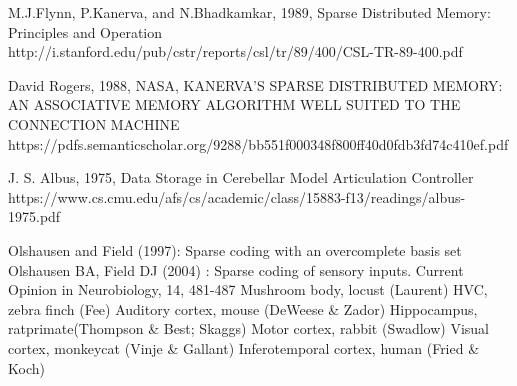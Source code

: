 \documentclass[10pt,a4paper]{article}
\begin{document}
\begin{thebibliography}{4}

 M.J.Flynn, P.Kanerva, and N.Bhadkamkar, 1989, Sparse Distributed Memory: Principles and Operation
http://i.stanford.edu/pub/cstr/reports/csl/tr/89/400/CSL-TR-89-400.pdf

 David Rogers, 1988, NASA, KANERVA’S SPARSE DISTRIBUTED MEMORY: AN ASSOCIATIVE MEMORY ALGORITHM WELL SUITED TO THE CONNECTION MACHINE
https://pdfs.semanticscholar.org/9288/bb551f000348f800ff40d0fdb3fd74c410ef.pdf

 J. S. Albus, 1975, Data Storage in Cerebellar Model Articulation Controller
https://www.cs.cmu.edu/afs/cs/academic/class/15883-f13/readings/albus-1975.pdf



 Olshausen and Field (1997): Sparse coding with an overcomplete basis set
 Olshausen BA, Field DJ (2004) : Sparse coding of sensory inputs. Current Opinion in Neurobiology, 14, 481-487
 Mushroom body, locust  (Laurent)
 HVC, zebra finch (Fee)
 Auditory cortex, mouse  (DeWeese \& Zador)
 Hippocampus, rat\/primate(Thompson \& Best; Skaggs)
 Motor cortex, rabbit  (Swadlow)
 Visual cortex, monkey\/cat  (Vinje \& Gallant)
 Inferotemporal cortex, human (Fried \& Koch)



\end{thebibliography}
\end{document}

